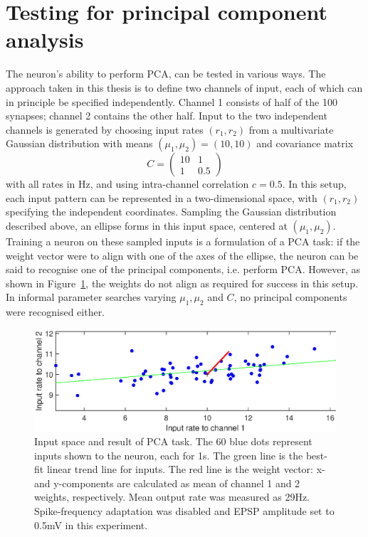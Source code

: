 \documentclass[a4paper,12pt]{report}
\theoremstyle{definition}
\begin{document}
\section{Testing for principal component analysis} %
The neuron's ability to perform PCA, can be tested in various ways. The approach taken in this thesis is to define two channels of input, each of which can in principle be specified independently. Channel 1 consists of half of the 100 synapses; channel 2 contains the other half. Input to the two independent channels is generated by choosing input rates $(r_1, r_2)$ from a multivariate Gaussian distribution with means $(\mu_1, \mu_2)=(10,10)$ and covariance matrix
$$
C =
\begin{pmatrix}
  10 & 1 \\
  1 & 0.5
 \end{pmatrix}
$$
with all rates in Hz, and using intra-channel correlation $c=0.5$. In this setup, each input pattern can be represented in a two-dimensional space, with $(r_1, r_2)$ specifying the independent coordinates. Sampling the Gaussian distribution described above, an ellipse forms in this input space, centered at $(\mu_1, \mu_2)$. Training a neuron on these sampled inputs is a formulation of a PCA task: if the weight vector were to align with one of the axes of the ellipse, the neuron can be said to recognise one of the principal components, i.e. perform PCA. However, as shown in Figure~\ref{fig:exp10_pca}, the weights do not align as required for success in this setup. In informal parameter searches varying $\mu_1, \mu_2$ and $C$, no principal components were recognised either.

\begin{figure}[!htb]
    \centering
    \includegraphics[width=\textwidth]{figures/exp10_pca.eps}
    \caption{Input space and result of PCA task. The 60 blue dots represent inputs shown to the neuron, each for 1s. The green line is the best-fit linear trend line for inputs. The red line is the weight vector: x- and y-components are calculated as mean of channel 1 and 2 weights, respectively. Mean output rate was measured as 29Hz. Spike-frequency adaptation was disabled and EPSP amplitude set to 0.5mV in this experiment.}
    \label{fig:exp10_pca}
\end{figure}
\end{document}
